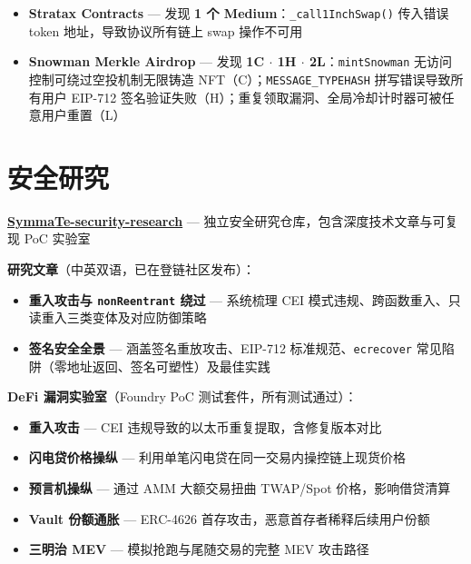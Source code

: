 \documentclass[8.5pt, a4paper]{article}
\begin{document}
\begin{itemize}
  \item \textbf{Stratax Contracts} --- 发现 \textbf{1 个 Medium}：\texttt{\_call1InchSwap()} 传入错误 token 地址，导致协议所有链上 swap 操作不可用
  \item \textbf{Snowman Merkle Airdrop} --- 发现 \textbf{1C $\cdot$ 1H $\cdot$ 2L}：\texttt{mintSnowman} 无访问控制可绕过空投机制无限铸造 NFT（C）；\texttt{MESSAGE\_TYPEHASH} 拼写错误导致所有用户 EIP-712 签名验证失败（H）；重复领取漏洞、全局冷却计时器可被任意用户重置（L）
\end{itemize}


\section{安全研究}

\noindent\href{https://github.com/SymmaTe/SymmaTe-security-research}{\textbf{SymmaTe-security-research}} --- 独立安全研究仓库，包含深度技术文章与可复现 PoC 实验室

\vspace{3pt}
\noindent\textbf{研究文章}（中英双语，已在登链社区发布）：
\begin{itemize}
  \item \textbf{重入攻击与 \texttt{nonReentrant} 绕过} --- 系统梳理 CEI 模式违规、跨函数重入、只读重入三类变体及对应防御策略
  \item \textbf{签名安全全景} --- 涵盖签名重放攻击、EIP-712 标准规范、\texttt{ecrecover} 常见陷阱（零地址返回、签名可塑性）及最佳实践
\end{itemize}

\vspace{3pt}
\noindent\textbf{DeFi 漏洞实验室}（Foundry PoC 测试套件，所有测试通过）：
\begin{itemize}
  \item \textbf{重入攻击} --- CEI 违规导致的以太币重复提取，含修复版本对比
  \item \textbf{闪电贷价格操纵} --- 利用单笔闪电贷在同一交易内操控链上现货价格
  \item \textbf{预言机操纵} --- 通过 AMM 大额交易扭曲 TWAP/Spot 价格，影响借贷清算
  \item \textbf{Vault 份额通胀} --- ERC-4626 首存攻击，恶意首存者稀释后续用户份额
  \item \textbf{三明治 MEV} --- 模拟抢跑与尾随交易的完整 MEV 攻击路径
\end{itemize}
\end{document}
